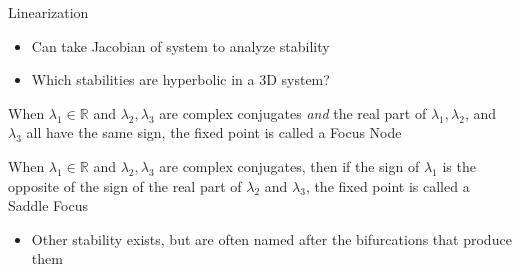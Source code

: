 \documentclass{beamer}
\newcommand{\RR}{\mathbb{R}}
\begin{document}
\begin{frame}{Linearization}
    \begin{itemize}
        \item Can take Jacobian of system to analyze stability
        \pause
        \item Which stabilities are hyperbolic in a 3D system?
        \pause
    \end{itemize}
    \begin{definition}
        When $\lambda_{1}\in\RR$ and $\lambda_{2},\lambda_{3}$ are complex conjugates \textit{and} the real part of $\lambda_{1},\lambda_{2}$, and $\lambda_{3}$ all have the same sign, the fixed point is called a \alert{Focus Node}
    \end{definition}
    \pause
    \begin{definition}
        When $\lambda_{1}\in\RR$ and $\lambda_{2},\lambda_{3}$ are complex conjugates, then if the sign of $\lambda_{1}$ is the opposite of the sign of the real part of $\lambda_{2}$ and $\lambda_{3}$, the fixed point is called a \alert{Saddle Focus}
    \end{definition}
    \pause
    \begin{itemize}
        \item Other stability exists, but are often named after the bifurcations that produce them
    \end{itemize}
\end{frame}
\end{document}
